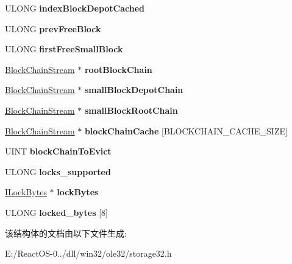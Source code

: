 \begin{DoxyCompactItemize}
U\+L\+O\+NG {\bfseries index\+Block\+Depot\+Cached}
\item 
\mbox{\label{struct_storage_impl_a0db5759fd8dda18a32a9db7025469f85}} 
U\+L\+O\+NG {\bfseries prev\+Free\+Block}
\item 
\mbox{\label{struct_storage_impl_a70ad3e786e70322f178f48477c625cf6}} 
U\+L\+O\+NG {\bfseries first\+Free\+Small\+Block}
\item 
\mbox{\label{struct_storage_impl_a83f6f422ccd78a6021ccbac72f7ad13a}} 
\hyperlink{struct_block_chain_stream}{Block\+Chain\+Stream} $\ast$ {\bfseries root\+Block\+Chain}
\item 
\mbox{\label{struct_storage_impl_a6d72ba21dcf52c97ba45f55f0d3173c4}} 
\hyperlink{struct_block_chain_stream}{Block\+Chain\+Stream} $\ast$ {\bfseries small\+Block\+Depot\+Chain}
\item 
\mbox{\label{struct_storage_impl_a776117b7751bb9d0dfdf6bc13f367249}} 
\hyperlink{struct_block_chain_stream}{Block\+Chain\+Stream} $\ast$ {\bfseries small\+Block\+Root\+Chain}
\item 
\mbox{\label{struct_storage_impl_a95c4135d8f7979ee7c9e8c678aafd6af}} 
\hyperlink{struct_block_chain_stream}{Block\+Chain\+Stream} $\ast$ {\bfseries block\+Chain\+Cache} \mbox{[}B\+L\+O\+C\+K\+C\+H\+A\+I\+N\+\_\+\+C\+A\+C\+H\+E\+\_\+\+S\+I\+ZE\mbox{]}
\item 
\mbox{\label{struct_storage_impl_a5781885009b69721b4fd84c73f16cf10}} 
U\+I\+NT {\bfseries block\+Chain\+To\+Evict}
\item 
\mbox{\label{struct_storage_impl_a98c2b53bfcbb275efff0ba1c874c7075}} 
U\+L\+O\+NG {\bfseries locks\+\_\+supported}
\item 
\mbox{\label{struct_storage_impl_a42f177bf55417e605e8bbc404a340d23}} 
\hyperlink{interface_i_lock_bytes}{I\+Lock\+Bytes} $\ast$ {\bfseries lock\+Bytes}
\item 
\mbox{\label{struct_storage_impl_ad1a366166bdff6d9ed6188970cfb46e1}} 
U\+L\+O\+NG {\bfseries locked\+\_\+bytes} \mbox{[}8\mbox{]}
\end{DoxyCompactItemize}


该结构体的文档由以下文件生成\+:\begin{DoxyCompactItemize}
\item 
E\+:/\+React\+O\+S-\/0../dll/win32/ole32/storage32.\+h\end{DoxyCompactItemize}
